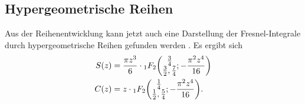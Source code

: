 \subsection{Hypergeometrische Reihen}
Aus der Reihenentwicklung kann jetzt auch eine Darstellung der
Fresnel-Integrale durch hypergeometrische Reihen gefunden werden
\cite{fresnel:fresnelC}.
Es ergibt sich
\begin{align*}
S(z)
&=
\frac{\pi z^3}{6}
\cdot
\mathstrut_1F_2\biggl(
\begin{matrix}\frac34\\\frac32,\frac74\end{matrix}
;
-\frac{\pi^2z^4}{16}
\biggr)
\\
C(z)
&=
z
\cdot
\mathstrut_1F_2\biggl(
\begin{matrix}\frac14\\\frac12,\frac54\end{matrix}
;
-\frac{\pi^2z^4}{16}
\biggr).
\end{align*}


